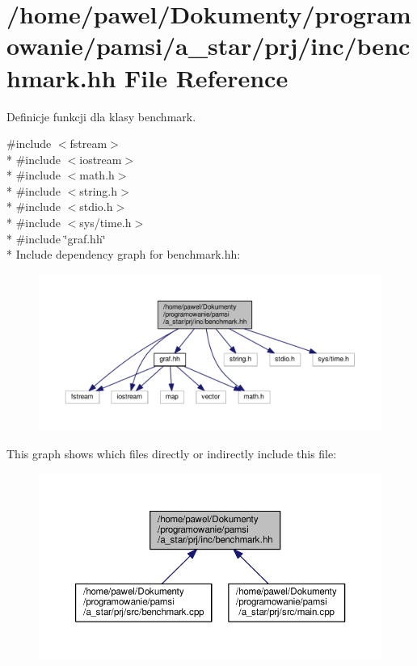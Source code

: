 \hypertarget{benchmark_8hh}{\section{/home/pawel/\-Dokumenty/programowanie/pamsi/a\-\_\-star/prj/inc/benchmark.hh File Reference}
\label{benchmark_8hh}
}


Definicje funkcji dla klasy benchmark.  


{\ttfamily \#include $<$fstream$>$}\\*
{\ttfamily \#include $<$iostream$>$}\\*
{\ttfamily \#include $<$math.\-h$>$}\\*
{\ttfamily \#include $<$string.\-h$>$}\\*
{\ttfamily \#include $<$stdio.\-h$>$}\\*
{\ttfamily \#include $<$sys/time.\-h$>$}\\*
{\ttfamily \#include \char`\"{}graf.\-hh\char`\"{}}\\*
Include dependency graph for benchmark.\-hh\-:
\nopagebreak
\begin{figure}[H]
\begin{center}
\leavevmode
\includegraphics[width=350pt]{benchmark_8hh__incl}
\end{center}
\end{figure}
This graph shows which files directly or indirectly include this file\-:
\nopagebreak
\begin{figure}[H]
\begin{center}
\leavevmode
\includegraphics[width=350pt]{benchmark_8hh__dep__incl}
\end{center}
\end{figure}
